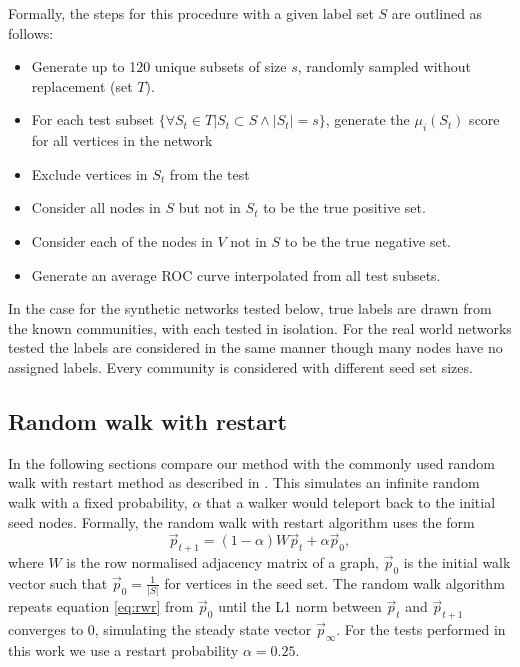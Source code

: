 \documentclass[sigconf]{acmart}
\begin{document}
Formally, the steps for this procedure with a given label set $S$ are outlined as follows:
\begin{itemize}
 \item Generate up to 120 unique subsets of size $s$, randomly sampled without replacement (set $T$).
 \item For each test subset $\{\forall S_t \in T | S_t \subset S \wedge |S_t| = s \}$, generate the $\mu_i(S_t)$ score for all vertices in the network
 \item Exclude vertices in $S_t$ from the test
 \item Consider all nodes in $S$ but not in $S_t$ to be the true positive set.
 \item Consider each of the nodes in $V$ not in $S$ to be the true negative set.
 \item Generate an average ROC curve interpolated from all test subsets.
 \end{itemize}

In the case for the synthetic networks tested below, true labels are drawn from the known communities, with each tested in isolation.
For the real world networks tested the labels are considered in the same manner though many nodes have no assigned labels.
Every community is considered with different seed set sizes.
 
\subsection{Random walk with restart}
In the following sections compare our method with the commonly used random walk with restart method as described in \cite{kohler2008walking}.
This simulates an infinite random walk with a fixed probability, $\alpha$ that a walker would teleport back to the initial seed nodes. 
Formally, the random walk with restart algorithm uses the form
\begin{equation} \label{eq:rwr}
 \vec{p}_{t+1} = (1 - \alpha) W \vec{p}_t + \alpha \vec{p}_0,
\end{equation}
where $W$ is the row normalised adjacency matrix of a graph, $\vec{p}_0$ is the initial walk vector such that $\vec{p}_0 = \frac{1}{|S|}$ for vertices in the seed set.
The random walk algorithm repeats equation \ref{eq:rwr} from $\vec{p}_0$ until the L1 norm between  $\vec{p}_t$ and  $\vec{p}_{t+1}$ converges to 0, simulating the steady state vector $\vec{p}_{\infty}$.
For the tests performed in this work we use a restart probability $\alpha = 0.25$.
\end{document}
